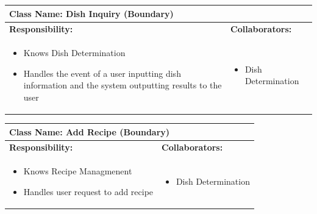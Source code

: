 \documentclass[]{article}
\begin{document}
\begin{table}[H]
	\centering
	\begin{tabular}{|p{7cm}|p{7cm}|}
	\hline 
	 \multicolumn{2}{|l|}{\textbf{Class Name:} Dish Inquiry (Boundary)} \\
	\hline
	\textbf{Responsibility:} & \textbf{Collaborators:} \\
	\hline
	\raggedright
	\begin{itemize}
		\item Knows Dish Determination
		\item Handles the event of a user inputting dish information and the system outputting results to the user
	\end{itemize}
	\vspace{1in} & 
	\begin{itemize}
		\item Dish Determination
	\end{itemize} \\
	\hline
	\end{tabular}
\end{table}

\begin{table}[H]
	\centering
	\begin{tabular}{|p{7cm}|p{7cm}|}
	\hline 
	 \multicolumn{2}{|l|}{\textbf{Class Name:} Add Recipe (Boundary)} \\
	\hline
	\textbf{Responsibility:} & \textbf{Collaborators:} \\
	\hline
	\raggedright
	\begin{itemize}
		\item Knows Recipe Managmenent
		\item Handles user request to add recipe
	\end{itemize}
	\vspace{1in} & 
	\begin{itemize}
		\item Dish Determination
	\end{itemize} \\
	\hline
	\end{tabular}
\end{table}
\end{document}
